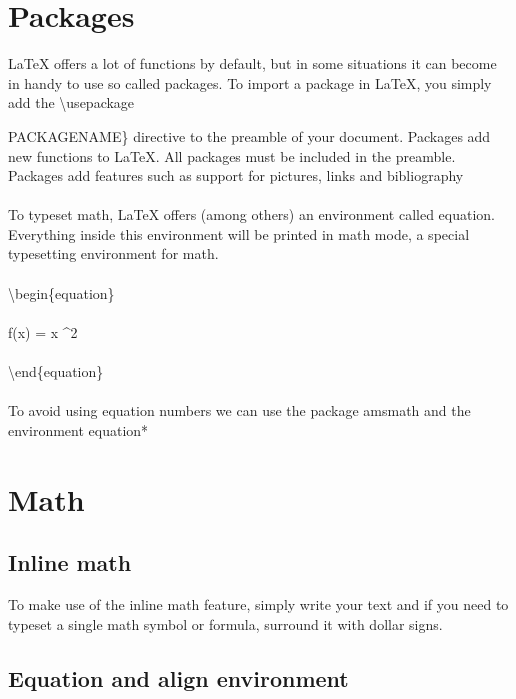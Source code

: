 \documentclass{article}
\begin{document}
\section{Packages}
LaTeX offers a lot of functions by default, but in some situations it can become in handy to use so called packages. To import a package in LaTeX, you simply add the \textbackslash usepackage\
{PACKAGENAME\} directive to the preamble of your document. Packages add new functions to LaTeX. All packages must be included in the preamble. Packages add features such as support for pictures, links and bibliography

\paragraph{}
To typeset math, LaTeX offers (among others) an environment called equation. Everything inside this environment will be printed in math mode, a special typesetting environment for math.

\paragraph{}
\textbackslash begin\{equation\}
\paragraph{}
	f(x) = x \textasciicircum 2
\paragraph{}
\textbackslash end\{equation\}

\paragraph{}
To avoid using equation numbers we can use the package amsmath and the environment equation*

\section{Math}
\subsection{Inline math}
To make use of the inline math feature, simply write your text and if you need to typeset a single math symbol or formula, surround it with dollar signs.

\subsection{Equation and align environment}
}
\end{document}
